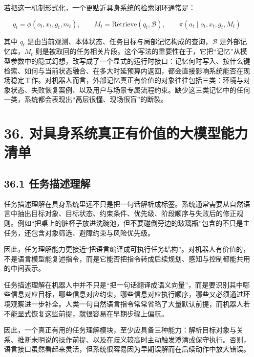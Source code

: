若把这一机制形式化，一个更贴近具身系统的检索闭环通常是：

\begingroup
\scriptsize
\begin{equation*}
q_t=\phi(o_t, x_t, g_t, m_t), \qquad
M_t=\mathrm{Retrieve}(q_t,\mathcal{B}), \qquad
\pi(a_t \mid o_t, x_t, g_t, M_t)
\end{equation*}
\endgroup

其中 \(q_t\) 是由当前观测、本体状态、任务目标与局部记忆构成的查询，\(\mathcal{B}\) 是外部记忆库，\(M_t\) 则是被取回的任务相关片段。这个写法的重要性在于，它把“记忆”从模型参数中的隐式幻想，改写成了一个显式的运行时接口：记忆何时写入、按什么键检索、如何与当前状态融合、在多大时延预算内返回，都会直接影响系统能否在现场稳定工作。对机器人而言，外部记忆真正有价值的对象往往包括三类：环境与对象状态、失败恢复案例、以及用户与场景专属流程约束。缺少这三类记忆中的任何一类，系统都会表现出“高层很懂、现场很盲”的断裂。

\section*{36. 对具身系统真正有价值的大模型能力清单}

\subsection*{36.1 任务描述理解}


任务描述理解在具身系统里远不只是把一句话解析成标签。系统通常需要从自然语言中抽出目标对象、目标状态、约束条件、优先级、阶段顺序与失败后的修正规则。例如“把桌上的脏杯子放进洗碗池，但不要碰倒旁边的玻璃瓶”包含的不只是主任务，还包含对象筛选、避障约束与风险优先级。

因此，任务理解能力更接近“把语言编译成可执行任务结构”。对机器人有价值的，不是语言模型能复述指令，而是它能否把指令转成后续规划、感知与控制都能共用的中间表示。

任务描述理解在机器人中并不只是“把一句话翻译成语义向量”，而是要识别其中哪些信息对应目标，哪些信息对应约束，哪些信息对应执行顺序，哪些又必须通过环境观察进一步补全。人类一句自然语言指令常常省略了大量默认前提，而机器人若不能显式恢复这些前提，就很容易在早期步骤上偏航。

因此，一个真正有用的任务理解模块，至少应具备三种能力：解析目标对象与关系、推断未明说的操作前提、以及在歧义较高时主动触发澄清或保守执行。否则，语言接口虽然看起来灵活，但系统很容易因为早期误解而在后续动作中放大错误。

